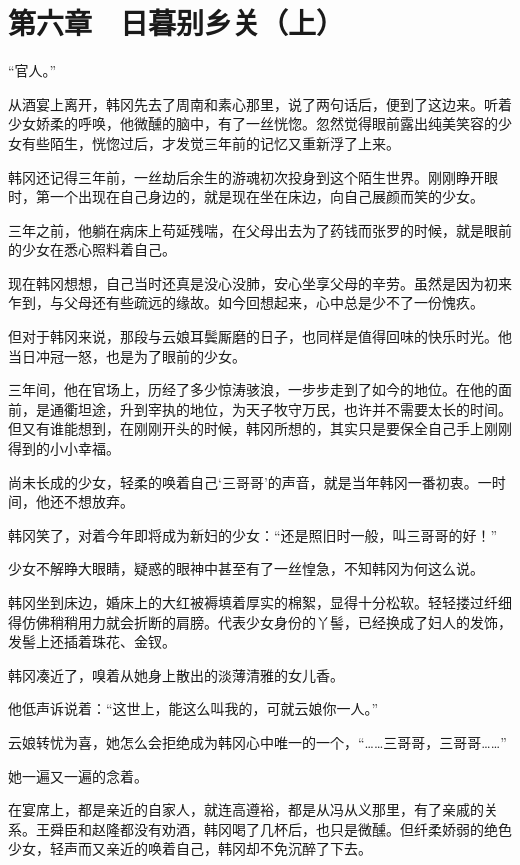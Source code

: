 \section{第六章　日暮别乡关（上）}

“官人。”

从酒宴上离开，韩冈先去了周南和素心那里，说了两句话后，便到了这边来。听着少女娇柔的呼唤，他微醺的脑中，有了一丝恍惚。忽然觉得眼前露出纯美笑容的少女有些陌生，恍惚过后，才发觉三年前的记忆又重新浮了上来。

韩冈还记得三年前，一丝劫后余生的游魂初次投身到这个陌生世界。刚刚睁开眼时，第一个出现在自己身边的，就是现在坐在床边，向自己展颜而笑的少女。

三年之前，他躺在病床上苟延残喘，在父母出去为了药钱而张罗的时候，就是眼前的少女在悉心照料着自己。

现在韩冈想想，自己当时还真是没心没肺，安心坐享父母的辛劳。虽然是因为初来乍到，与父母还有些疏远的缘故。如今回想起来，心中总是少不了一份愧疚。

但对于韩冈来说，那段与云娘耳鬓厮磨的日子，也同样是值得回味的快乐时光。他当日冲冠一怒，也是为了眼前的少女。

三年间，他在官场上，历经了多少惊涛骇浪，一步步走到了如今的地位。在他的面前，是通衢坦途，升到宰执的地位，为天子牧守万民，也许并不需要太长的时间。但又有谁能想到，在刚刚开头的时候，韩冈所想的，其实只是要保全自己手上刚刚得到的小小幸福。

尚未长成的少女，轻柔的唤着自己‘三哥哥’的声音，就是当年韩冈一番初衷。一时间，他还不想放弃。

韩冈笑了，对着今年即将成为新妇的少女：“还是照旧时一般，叫三哥哥的好！”

少女不解睁大眼睛，疑惑的眼神中甚至有了一丝惶急，不知韩冈为何这么说。

韩冈坐到床边，婚床上的大红被褥填着厚实的棉絮，显得十分松软。轻轻搂过纤细得仿佛稍稍用力就会折断的肩膀。代表少女身份的丫髻，已经换成了妇人的发饰，发髻上还插着珠花、金钗。

韩冈凑近了，嗅着从她身上散出的淡薄清雅的女儿香。

他低声诉说着：“这世上，能这么叫我的，可就云娘你一人。”

云娘转忧为喜，她怎么会拒绝成为韩冈心中唯一的一个，“……三哥哥，三哥哥……”

她一遍又一遍的念着。

在宴席上，都是亲近的自家人，就连高遵裕，都是从冯从义那里，有了亲戚的关系。王舜臣和赵隆都没有劝酒，韩冈喝了几杯后，也只是微醺。但纤柔娇弱的绝色少女，轻声而又亲近的唤着自己，韩冈却不免沉醉了下去。


